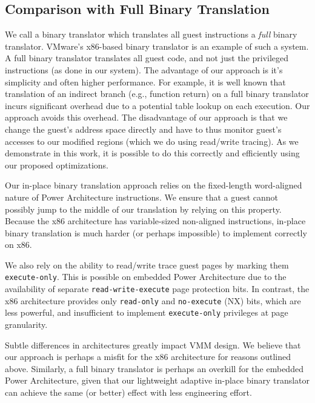 \documentclass[10pt,twocolumn]{article}
\begin{document}
\subsection{Comparison with Full Binary Translation}
\label{sec:comparison_with_full_bt}
We call a binary translator which translates all guest instructions a {\em full}
binary translator.
VMware's x86-based binary translator\cite{adams:asplos06} is an example of
such a system. A full binary translator translates all guest code, and not
just the privileged instructions (as done in our system). The advantage of
our approach is it's simplicity and often higher performance.
For example, it is well known that translation of an indirect branch (e.g., function
return)
on a full binary translator incurs significant overhead due to a potential
table lookup on each execution. Our approach avoids this overhead.
The disadvantage of our approach is that we change the guest's address space
directly and have to thus monitor guest's accesses to our modified regions
(which we do using read/write tracing). As we demonstrate in this work, it is
possible to do this correctly and efficiently using our proposed optimizations.

Our in-place binary translation approach relies on the fixed-length word-aligned
nature of Power Architecture instructions. We ensure that a guest cannot possibly
jump to the middle of our translation by relying on this property. Because the
x86 architecture has variable-sized non-aligned instructions, in-place binary
translation is much harder (or perhaps impossible) to implement correctly
on x86.

We also rely on the ability to read/write trace guest pages by marking them
{\tt execute-only}. This is possible on embedded Power Architecture due to the
availability of separate
{\tt read-write-execute} page protection bits.
In contrast, the x86 architecture provides only {\tt read-only} and
{\tt no-execute} (NX) bits, which are less powerful, and insufficient
to implement {\tt execute-only} privileges at page granularity.

Subtle
differences in architectures greatly impact VMM design. We believe that our
approach is perhaps a misfit for the x86 architecture for reasons outlined above.
Similarly, a full binary translator is perhaps an overkill for the embedded
Power Architecture, given that our lightweight adaptive in-place binary translator
can achieve the same (or better) effect with less engineering effort.
\end{document}
